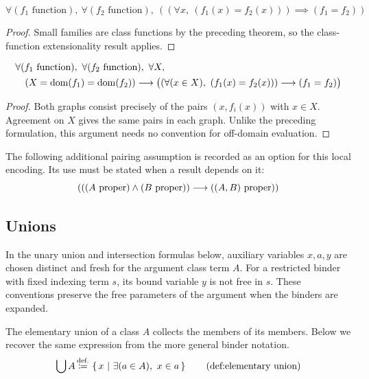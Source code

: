 \begin{theorem}
\[
\forall (f_1 \text{ function}),\ %
\forall (f_2 \text{ function}),\ %
(
(
\forall x,\ %
(f_1(x) = f_2(x))
)
\implies
(f_1 = f_2)
)
\]
\end{theorem}
\begin{proof}
Small families are class functions by the preceding theorem, so the
class-function extensionality result applies.
\end{proof}
\begin{theorem}
\[
\begin{aligned}
&\forall (f_1 \text{ function}),\
\forall (f_2 \text{ function}),\ \forall X,\\
&\quad (X=\mathrm{dom}(f_1)=\mathrm{dom}(f_2))\longrightarrow
\bigl((\forall (x\in X),\ (f_1(x)=f_2(x)))\longrightarrow(f_1=f_2)\bigr)
\end{aligned}
\]
\end{theorem}
\begin{proof}
Both graphs consist precisely of the pairs $(x,f_i(x))$ with $x\in X$.
Agreement on $X$ gives the same pairs in each graph. Unlike the preceding
formulation, this argument needs no convention for off-domain evaluation.
\end{proof}


\begin{axiom}
The following additional pairing assumption is recorded as an option for this local encoding. Its use must be stated when a result depends on it:
\[
(
(
(A{\text{ proper}})
\land
(B{\text{ proper}})
)
\longrightarrow
((A,B){\text{ proper}})
)
\]
\end{axiom}
\subsection{Unions}
In the unary union and intersection formulas below, auxiliary variables
$x,a,y$ are chosen distinct and fresh for the argument class term $A$.
For a restricted binder with fixed indexing term $s$, its bound variable
$y$ is not free in $s$. These conventions preserve the free parameters
of the argument when the binders are expanded.
\begin{definition}
The elementary union of a class $A$ collects the members of its members. Below we recover the same expression from the more general binder notation.%
\[
\union A \eqdef \cc{x}{\exists (a\in A),\ x\in a}
\clabeltagd{def}{elementary union}
\]
\end{definition}

